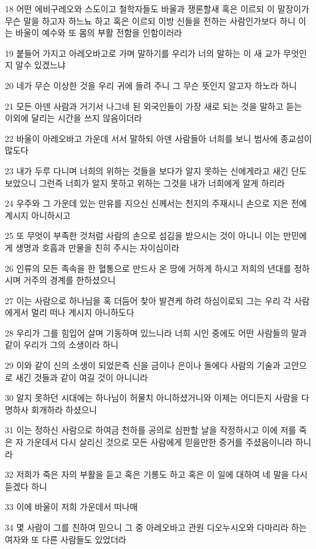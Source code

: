 \par 18 어떤 에비구레오와 스도이고 철학자들도 바울과 쟁론할새 혹은 이르되 이 말장이가 무슨 말을 하고자 하느뇨 하고 혹은 이르되 이방 신들을 전하는 사람인가보다 하니 이는 바울이 예수와 또 몸의 부활 전함을 인함이러라
\par 19 붙들어 가지고 아레오바고로 가며 말하기를 우리가 너의 말하는 이 새 교가 무엇인지 알수 있겠느냐
\par 20 네가 무슨 이상한 것을 우리 귀에 들려 주니 그 무슨 뜻인지 알고자 하노라 하니
\par 21 모든 아덴 사람과 거기서 나그네 된 외국인들이 가장 새로 되는 것을 말하고 듣는 이외에 달리는 시간을 쓰지 않음이더라
\par 22 바울이 아레오바고 가운데 서서 말하되 아덴 사람들아 너희를 보니 범사에 종교성이 많도다
\par 23 내가 두루 다니며 너희의 위하는 것들을 보다가 알지 못하는 신에게라고 새긴 단도 보았으니 그런즉 너희가 알지 못하고 위하는 그것을 내가 너희에게 알게 하리라
\par 24 우주와 그 가운데 있는 만유를 지으신 신께서는 천지의 주재시니 손으로 지은 전에 계시지 아니하시고
\par 25 또 무엇이 부족한 것처럼 사람의 손으로 섬김을 받으시는 것이 아니니 이는 만민에게 생명과 호흡과 만물을 친히 주시는 자이심이라
\par 26 인류의 모든 족속을 한 혈통으로 만드사 온 땅에 거하게 하시고 저희의 년대를 정하시며 거주의 경계를 한하셨으니
\par 27 이는 사람으로 하나님을 혹 더듬어 찾아 발견케 하려 하심이로되 그는 우리 각 사람에게서 멀리 떠나 계시지 아니하도다
\par 28 우리가 그를 힘입어 살며 기동하며 있느니라 너희 시인 중에도 어떤 사람들의 말과 같이 우리가 그의 소생이라 하니
\par 29 이와 같이 신의 소생이 되었은즉 신을 금이나 은이나 돌에다 사람의 기술과 고안으로 새긴 것들과 같이 여길 것이 아니니라
\par 30 알지 못하던 시대에는 하나님이 허물치 아니하셨거니와 이제는 어디든지 사람을 다 명하사 회개하라 하셨으니
\par 31 이는 정하신 사람으로 하여금 천하를 공의로 심판할 날을 작정하시고 이에 저를 죽은 자 가운데서 다시 살리신 것으로 모든 사람에게 믿을만한 증거를 주셨음이니라 하니라
\par 32 저희가 죽은 자의 부활을 듣고 혹은 기롱도 하고 혹은 이 일에 대하여 네 말을 다시 듣겠다 하니
\par 33 이에 바울이 저희 가운데서 떠나매
\par 34 몇 사람이 그를 친하여 믿으니 그 중 아레오바고 관원 디오누시오와 다마리라 하는 여자와 또 다른 사람들도 있었더라

